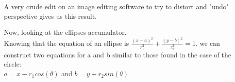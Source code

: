 \documentclass[11pt]{article}
\begin{document}
    \begin{center}
    \end{center}
    { \hspace*{\fill} \\}
    
    \begin{center}
    \end{center}
    { \hspace*{\fill} \\}
    
    A very crude edit on an image editing software to try to distort and
"undo" perspective gives us this result.

    Now, looking at the ellipses accumulator.\\
Knowing that the equation of an ellipse is
\(\frac{(x-a)^2}{r_1^2} + \frac{(y-b)^2}{r_2^2} = 1\), we can construct
two equations for a and b similar to those found in the case of the
circle:\\
\(a = x - r_1 cos(\theta)\) and \(b = y + r_2 sin(\theta)\)
\end{document}
